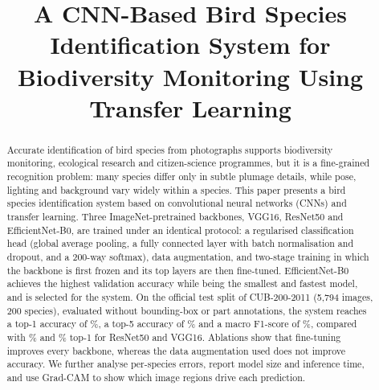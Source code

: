 \documentclass[conference]{IEEEtran}
\begin{document}
\title{A CNN-Based Bird Species Identification System for Biodiversity Monitoring Using Transfer Learning}

\author{
\and
{}
\and
{}
}

\maketitle

\begin{abstract}
Accurate identification of bird species from photographs supports biodiversity
monitoring, ecological research and citizen-science programmes, but it is a
fine-grained recognition problem: many species differ only in subtle plumage
details, while pose, lighting and background vary widely within a species. This
paper presents a bird species identification system based on convolutional
neural networks (CNNs) and transfer learning. Three ImageNet-pretrained
backbones, VGG16, ResNet50 and EfficientNet-B0, are trained under an identical
protocol: a regularised classification head (global average pooling, a fully
connected layer with batch normalisation and dropout, and a 200-way softmax),
data augmentation, and two-stage training in which the backbone is first frozen
and its top layers are then fine-tuned. EfficientNet-B0 achieves the highest
validation accuracy while being the smallest and fastest model, and is selected
for the system. On the official test split of CUB-200-2011 (5,794 images, 200 species),
evaluated without bounding-box or part annotations, the system reaches a top-1
accuracy of \EffNetTopOne\%, a top-5 accuracy of \EffNetTopFive\% and a macro
F1-score of \EffNetMacroF\%, compared with \ResNetTopOne\% and \VggTopOne\% top-1
for ResNet50 and VGG16. Ablations show that fine-tuning improves every backbone,
whereas the data augmentation used does not improve accuracy. We further analyse
per-species errors, report model size and inference time, and use Grad-CAM to
show which image regions drive each prediction.
\end{abstract}
\end{document}
